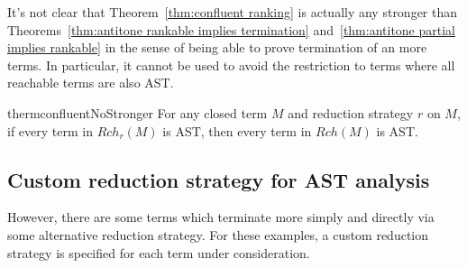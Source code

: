 \medskip
It's not clear that Theorem~\ref{thm:confluent ranking} is actually any stronger than Theorems~\ref{thm:antitone rankable implies termination} and~\ref{thm:antitone partial implies rankable} in the sense of being able to prove termination of an more terms. In particular, it cannot be used to avoid the restriction to terms where all reachable terms are also AST.

\begin{restatable}{therm}{confluentNoStronger}
\label{thm:confluentNoStronger}
For any closed term $M$ and reduction strategy $r$ on $M$, if every term in $\mathit{Rch}_r(M)$ is AST, then every term in $\mathit{Rch}(M)$ is AST.
\end{restatable}

\subsection{Custom reduction strategy for AST analysis} However, there are some terms which terminate more simply and directly via some alternative reduction strategy. For these examples, a custom reduction strategy is specified for each term under consideration.

